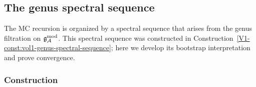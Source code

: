 %
%

\subsection{The genus spectral sequence}

The MC recursion is organized by a spectral sequence that arises
from the genus filtration on $\mathfrak{g}_{\mathcal{A}}^{\mathrm{mod}}$. This spectral sequence was
constructed in
Construction~\ref{V1-const:vol1-genus-spectral-sequence}; here we
develop its bootstrap interpretation and prove convergence.

\subsubsection{Construction}

